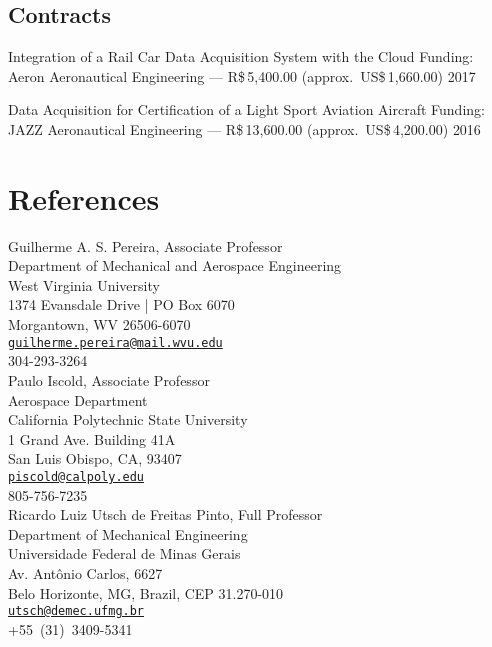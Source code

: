 \documentclass[letterpaper, 11pt, oneside]{memoir}
\begin{document}
\subsection{Contracts}
\begin{description} 
\item {Integration of a Rail Car Data Acquisition System with the Cloud}
{}{\newline Funding: Aeron Aeronautical Engineering ---
  R\$\,5,400.00 (approx.\ US\$\,1,660.00)}{}{}
 \hfill {2017}

\item 
{Data Acquisition for Certification of a Light Sport Aviation Aircraft}{}
{\newline Funding: JAZZ Aeronautical Engineering --- 
 R\$\,13,600.00 (approx.\ US\$\,4,200.00)}{}{}
\hfill {2016}
\end{description}

\section{References}
Guilherme A. S. Pereira, Associate Professor\\
Department of Mechanical and Aerospace Engineering\\
West Virginia University\\
1374 Evansdale Drive | PO Box 6070\\
Morgantown, WV 26506-6070 \\
\texttt{\href{mailto:guilherme.pereira@mail.wvu.edu}{guilherme.pereira@mail.wvu.edu}}\\
304-293-3264 
\\[1ex]

\noindent
Paulo Iscold, Associate Professor\\
Aerospace Department\\
California Polytechnic State University\\
1 Grand Ave. Building 41A\\
San Luis Obispo, CA, 93407\\
\texttt{\href{mailto:piscold@calpoly.edu}{piscold@calpoly.edu}}\\
805-756-7235
\\[1ex]

\noindent
Ricardo Luiz Utsch de Freitas Pinto, Full Professor\\
Department of Mechanical Engineering\\
Universidade Federal de Minas Gerais\\
Av. Antônio Carlos, 6627\\
Belo Horizonte, MG, Brazil, CEP 31.270-010\\
\texttt{\href{mailto:utsch@demec.ufmg.br}{utsch@demec.ufmg.br}}\\
+55~(31)~3409-5341
\end{document}

